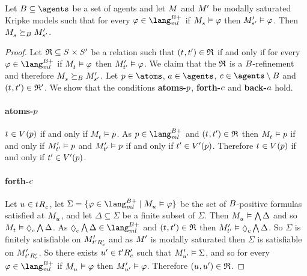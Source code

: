 \begin{proposition}\label{refinements-hennessy-milner}
Let $\agentsB \subseteq \agents$ be a set of agents and let $\kModel$ and ${M^{\prime}_{}}$ be modally saturated Kripke models such that for every $\phi \in \langMlPlusBs$ if $\kPModel{\kStateS} \entails \phi$ then ${M^{\prime}_{{s}^{\prime}}} \vDash \varphi$.
Then $\kPModel{\kStateS} \simulatesBs \kPModelP{\kStateSP}$.
\end{proposition}

\begin{proof}
Let $\refinement \subseteq \kStates \times \kStatesP$ be a relation such that $(\kStateT, \kStateTP) \in \refinement$ if and only if for every $\phi \in \langMlPlusBs$ if $\kPModel{\kStateT} \entails \phi$ then ${M^{\prime}_{{t}^{\prime}}} \vDash \varphi$.
We claim that the $\mathfrak{R}$ is a $B$-refinement and therefore $\kPModel{\kStateS} \simulatesBs \kPModelP{\kStateSP}$.
Let $\atomP \in \atoms$, $\agentA \in \agents$, $\agentC \in \agents \setminus \agentsB$ and $(\kStateT, \kStateTP) \in \refinement'$.
We show that the conditions {\bf atoms-$p$}, {\bf forth-$c$} and {\bf back-$a$} hold.

\paragraph{atoms-$p$}
$\kStateT \in \kValuation(\atomP)$ if and only if $\kPModel{\kStateT} \entails \atomP$.
As $\atomP \in \langMlPlusBs$ and $(\kStateT, \kStateTP) \in \refinement$ then $\kPModel{\kStateT} \entails \atomP$ if and only if ${M^{\prime}_{{t}^{\prime}}} \vDash p$
and ${M^{\prime}_{{t}^{\prime}}} \vDash p$ if and only if ${t}^{\prime} \in {V^{\prime}}(p)$.
Therefore $\kStateT \in \kValuation(\atomP)$ if and only if ${t}^{\prime} \in {V^{\prime}}(p)$.

\paragraph{forth-$c$}
Let $\kStateU \in \kSuccessorsC{\kStateT}$, let $\Sigma = \{\phi \in \langMlPlusBs \mid \kPModel{\kStateU} \entails \phi\}$ be the set of $B$-positive formulas satisfied at $\kPModel{\kStateU}$, and let $\Delta \subseteq \Sigma$ be a finite subset of $\Sigma$.
Then $\kPModel{\kStateU} \entails \bigwedge \Delta$ and so $\kPModel{\kStateT} \entails \possibleC \bigwedge \Delta$.
As $\possibleC \bigwedge \Delta \in \langMlPlusBs$ and $(\kStateT, \kStateTP) \in \refinement$ then $\kPModelP{\kStateTP} \entails \possibleC \bigwedge \Delta$.
So $\Sigma$ is finitely satisfiable on ${M^{\prime}_{{{t}^{\prime}} {R^{\prime}_{c}}}}$ and as ${M^{\prime}_{}}$ is modally saturated then $\Sigma$ is satisfiable on ${M^{\prime}_{{{t}^{\prime}} {R^{\prime}_{c}}}}$.
So there exists ${u}^{\prime} \in {{t}^{\prime}} {R^{\prime}_{c}}$ such that ${M^{\prime}_{{u}^{\prime}}} \vDash \Sigma$, and so for every $\phi \in \langMlPlusBs$ if $\kPModel{\kStateU} \entails \phi$ then ${M^{\prime}_{{u}^{\prime}}} \vDash \varphi$.
Therefore $(\kStateU, \kStateUP) \in \refinement$.


\end{proof}
